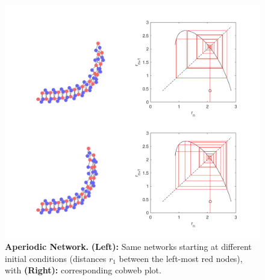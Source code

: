 \documentclass[12pt]{revtex4-1}
\begin{document}
\begin{figure}[h!]
	\centering
	\includegraphics[width=1.0\columnwidth]{aperiod_sim2.pdf}
	\caption{\textbf{Aperiodic Network.} \textbf{(Left):} Same networks starting at different initial conditions (distances $r_1$ between the left-most red nodes), with \textbf{(Right):} corresponding cobweb plot.}
	\label{fig:aperiod_sim2}
\end{figure}
\end{document}
